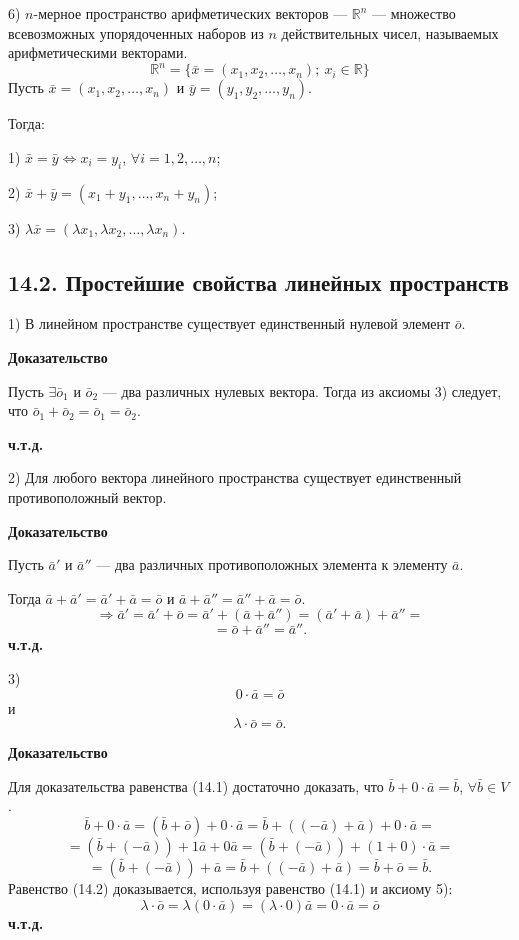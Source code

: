 \documentclass[12pt,a4paper]{article}
\newcommand{\va}{\bar a}
\newcommand{\vb}{\bar b}
\newcommand{\vo}{\bar o}
\newcommand{\vx}{\bar x}
\newcommand{\vy}{\bar y}
\begin{document}
6) $n$-мерное пространство арифметических векторов --- $\mathbb R^n$
--- множество всевозможных упорядоченных наборов из $n$
действительных чисел, называемых арифметическими векторами.
$$
\mathbb R^n=\{\vx=(x_1,x_2,\ldots,x_n);\ x_i\in\mathbb R\}
$$
Пусть $\vx=(x_1,x_2,\ldots,x_n)$ и $\vy=(y_1,y_2,\ldots,y_n)$.

Тогда:

1) $\vx=\vy\Leftrightarrow x_i=y_i$, $\forall i=1,2,\ldots,n$;

2) $\vx+\vy=(x_1+y_1,\ldots,x_n+y_n)$;

3) $\lambda\vx=(\lambda x_1,\lambda x_2,\ldots,\lambda x_n)$.

\subsection*{\textbf{14.2. Простейшие свойства линейных пространств}}

1) В линейном пространстве существует единственный нулевой элемент $\vo$.

\textbf{Доказательство}

Пусть $\exists\bar o_1$ и $\bar o_2$ --- два различных нулевых
вектора. Тогда из аксиомы 3) следует, что $\bar o_1+\bar o_2=\bar o_1=\bar o_2$.

\textbf{ч.т.д.}

2) Для любого вектора линейного пространства существует единственный
противоположный вектор.

\textbf{Доказательство}

Пусть $\va'$ и $\va''$ --- два различных противоположных элемента к
элементу $\va$.

Тогда $\va+\va'=\va'+\va=\vo$ и $\va+\va''=\va''+\va=\vo$.
$$
\Rightarrow \va'=\va'+\vo=\va'+(\va+\va'')=(\va'+\va)+\va''=
$$
$$
=\vo+\va''=\va''.
$$
\textbf{ч.т.д.}

3)
\begin{equation}
0\cdot\va=\vo \tag{14.1}
\end{equation}
и
\begin{equation}
\lambda\cdot\vo=\vo. \tag{14.2}
\end{equation}

\textbf{Доказательство}

Для доказательства равенства (14.1) достаточно доказать, что
$\vb+0\cdot\va=\vb$, $\forall\vb\in V$.
$$
\vb+0\cdot\va=(\vb+\vo)+0\cdot\va=\vb+((-\va)+\va)+0\cdot\va=
$$
$$
=(\vb+(-\va))+1\va+0\va=(\vb+(-\va))+(1+0)\cdot\va=
$$
$$
=(\vb+(-\va))+\va=\vb+((-\va)+\va)=\vb+\vo=\vb.
$$
Равенство (14.2) доказывается, используя равенство (14.1) и аксиому 5):
$$
\lambda\cdot\vo=\lambda(0\cdot\va)=(\lambda\cdot0)\va=0\cdot\va=\vo
$$
\textbf{ч.т.д.}
\end{document}
